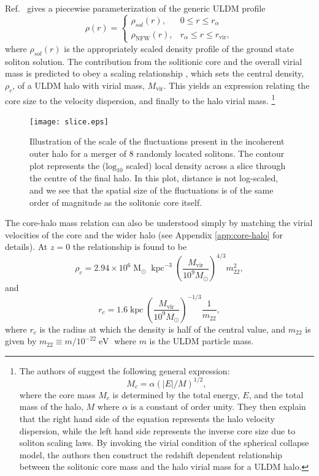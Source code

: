 \documentclass{pasa}%
\begin{document}
 
Ref.~\cite{Robles:2018fur} gives a piecewise parameterization of the generic ULDM profile 
%
\begin{equation}\label{eq:piecewise}
     \rho(r)=
    \begin{cases}
      \rho_{sol}(r), & 0\leq r \leq r_{\alpha} \\
      \rho_\mathrm{NFW}(r), & r_{\alpha}\leq r \leq r_{\mathrm{vir}},
    \end{cases}
\end{equation}
%
where $\rho_{sol}(r)$ is the appropriately scaled density profile of the ground state soliton solution. The contribution from the solitionic core and the overall virial mass is predicted to obey a scaling relationship \cite{Schive:2014hza, Chavanis:2019faf}, which sets the central density, $\rho_c$, of a ULDM halo with virial mass, $M_{\mathrm{vir}}$. This yields an expression relating the core size to the velocity dispersion, and finally to the halo virial mass.%
\footnote{The authors of \cite{Schive:2014hza} suggest the following general expression:
\begin{equation}
    M_c = \alpha \left(\vert E\vert/M\right)^{1/2},
\end{equation}
where the core mass $M_c$ is determined by the total energy, $E$, and the total mass of the halo, $M$ where $\alpha$ is a constant of order unity. They then explain that the right hand side of the equation represents the halo velocity dispersion, while the left hand side  represents the inverse core size due to soliton scaling laws. By invoking the virial condition of the spherical collapse model, the authors then  construct the redshift dependent relationship between the solitonic core mass and the halo virial mass for a ULDM halo.}

\begin{figure}[t]
\centering
\texttt{[image: slice.eps]}
\caption{Illustration of the scale of the fluctuations present in the incoherent outer halo for a merger of 8 randomly located solitons. The contour plot represents the ($\mathrm{log}_{10}$ scaled) local density across a slice through the centre of the final halo. In this plot, distance is not log-scaled, and we see that the spatial size of the fluctuations is of the same order of magnitude as the solitonic core itself.}\label{fig:contour}
\end{figure}
%
The core-halo mass relation can also be understood simply by matching the virial velocities of the core and the wider halo (see Appendix \ref{app:core-halo} for details). 
At $z=0$ the relationship is found to be \cite{Schive:2014hza} 
%
\begin{equation}\label{eq:central_dens}
    \rho_c = 2.94\times10^6 \operatorname{M}_{\odot}\operatorname{kpc}^{-3}\left(\frac{M_{\mathrm{vir}}}{10^9 M_{\odot}}\right)^{4/3}m_{22}^{2},
\end{equation}
and 
\begin{equation}
    r_c = 1.6 \operatorname{kpc}\left(\frac{M_{\mathrm{vir}}}{10^9 M_{\odot}}\right)^{-1/3}\frac{1}{m_{22}},
\end{equation}
%
where $r_c$ is the radius at which the density is half of the central value, and $m_{22}$ is given by $m_{22} \equiv m / 10^{-22} \operatorname{eV}$ where $m$ is the ULDM particle mass. 
\end{document}
